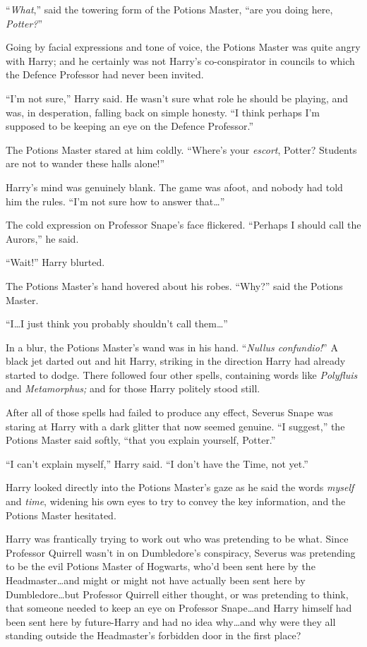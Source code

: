 “\emph{What},” said the towering form of the Potions Master, “are you doing here, \emph{Potter?}”

Going by facial expressions and tone of voice, the Potions Master was quite angry with Harry; and he certainly was not Harry’s co-conspirator in councils to which the Defence Professor had never been invited.

“I’m not sure,” Harry said. He wasn’t sure what role he should be playing, and was, in desperation, falling back on simple honesty. “I think perhaps I’m supposed to be keeping an eye on the Defence Professor.”

The Potions Master stared at him coldly. “Where’s your \emph{escort}, Potter? Students are not to wander these halls alone!”

Harry’s mind was genuinely blank. The game was afoot, and nobody had told him the rules. “I’m not sure how to answer that…”

The cold expression on Professor Snape’s face flickered. “Perhaps I should call the Aurors,” he said.

“Wait!” Harry blurted.

The Potions Master’s hand hovered about his robes. “Why?” said the Potions Master.

“I…I just think you probably shouldn’t call them…”

In a blur, the Potions Master’s wand was in his hand. “\emph{Nullus confundio!}” A black jet darted out and hit Harry, striking in the direction Harry had already started to dodge. There followed four other spells, containing words like \emph{Polyfluis} and \emph{Metamorphus;} and for those Harry politely stood still.

After all of those spells had failed to produce any effect, Severus Snape was staring at Harry with a dark glitter that now seemed genuine. “I suggest,” the Potions Master said softly, “that you explain yourself, Potter.”

“I can’t explain myself,” Harry said. “I don’t have the Time, not yet.”

Harry looked directly into the Potions Master’s gaze as he said the words \emph{myself} and \emph{time}, widening his own eyes to try to convey the key information, and the Potions Master hesitated.

Harry was frantically trying to work out who was pretending to be what. Since Professor Quirrell wasn’t in on Dumbledore’s conspiracy, Severus was pretending to be the evil Potions Master of Hogwarts, who’d been sent here by the Headmaster…and might or might not have actually been sent here by Dumbledore…but Professor Quirrell either thought, or was pretending to think, that someone needed to keep an eye on Professor Snape…and Harry himself had been sent here by future-Harry and had no idea why…and why were they all standing outside the Headmaster’s forbidden door in the first place?

